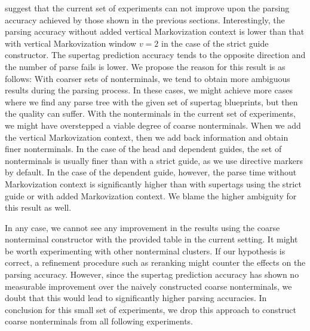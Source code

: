 \documentclass[../../document.tex]{subfiles}
\begin{document}
     suggest that the current set of experiments can not improve upon the parsing accuracy achieved by those shown in the previous sections.
    Interestingly, the parsing accuracy without added vertical Markovization context is lower than that with vertical Markovization window \(v=2\) in the case of the strict guide constructor. The supertag prediction accuracy tends to the opposite direction and the number of parse fails is lower.
    We propose the reason for this result is as follows:
        With coarser sets of nonterminals, we tend to obtain more ambiguous results during the parsing process.
        In these cases, we might achieve more cases where we find any parse tree with the given set of supertag blueprints, but then the quality can suffer.
        With the nonterminals in the current set of experiments, we might have overstepped a viable degree of coarse nonterminals.
        When we add the vertical Markovization context, then we add back information and obtain finer nonterminals.
        In the case of the head and dependent guides, the set of nonterminals is usually finer than with a strict guide, as we use directive markers by default.
    In the case of the dependent guide, however, the parse time without Markovization context is significantly higher than with supertags using the strict guide or with added Markovization context.
    We blame the higher ambiguity for this result as well.

    In any case, we cannot see any improvement in the results using the coarse nonterminal constructor with the provided table in the current setting.
    It might be worth experimenting with other nonterminal clusters.
    If our hypothesis is correct, a refinement procedure such as reranking might counter the effects on the parsing accuracy.
    However, since the supertag prediction accuracy has shown no measurable improvement over the naively constructed coarse nonterminals, we doubt that this would lead to significantly higher parsing accuracies.
    In conclusion for this small set of experiments, we drop this approach to construct coarse nonterminals from all following experiments.
\end{document}
